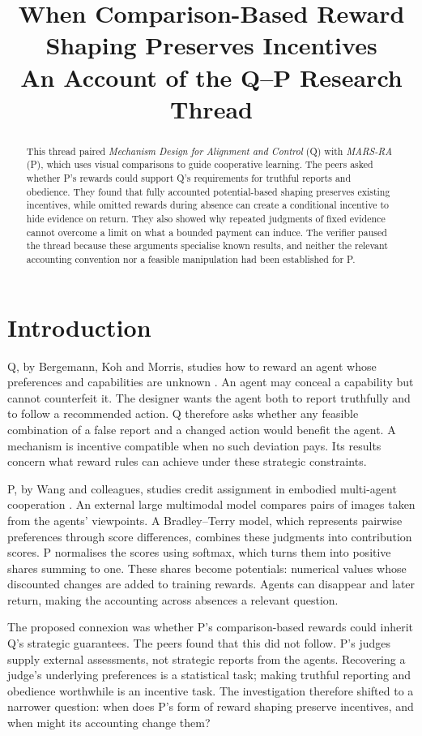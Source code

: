 \documentclass[11pt]{article}
\title{When Comparison-Based Reward Shaping Preserves Incentives\\
An Account of the Q--P Research Thread}
\author{}
\date{}
\begin{document}
\maketitle

\begin{abstract}
This thread paired \emph{Mechanism Design for Alignment and Control} (Q) with \emph{MARS-RA} (P), which uses
visual comparisons to guide cooperative learning.
The peers asked whether P's rewards could support Q's requirements for truthful reports and obedience.
They found that fully accounted potential-based shaping preserves existing incentives, while omitted rewards
during absence can create a conditional incentive to hide evidence on return.
They also showed why repeated judgments of fixed evidence cannot overcome a limit on what a bounded payment can induce.
The verifier paused the thread because these arguments specialise known results, and neither the relevant
accounting convention nor a feasible manipulation had been established for P.
\end{abstract}

\section{Introduction}

Q, by Bergemann, Koh and Morris, studies how to reward an agent whose preferences and capabilities are unknown
\cite{Q}. An agent may conceal a capability but cannot counterfeit it. The designer wants the agent both to
report truthfully and to follow a recommended action. Q therefore asks whether any feasible combination of a
false report and a changed action would benefit the agent. A mechanism is incentive compatible when no such
deviation pays. Its results concern what reward rules can achieve under these strategic constraints.

P, by Wang and colleagues, studies credit assignment in embodied multi-agent cooperation \cite{P}. An external
large multimodal model compares pairs of images taken from the agents' viewpoints. A Bradley--Terry model,
which represents pairwise preferences through score differences, combines these judgments into contribution
scores. P normalises the scores using softmax, which turns them into positive shares summing to one. These
shares become potentials: numerical values whose discounted changes are added to training rewards. Agents can
disappear and later return, making the accounting across absences a relevant question.

The proposed connexion was whether P's comparison-based rewards could inherit Q's strategic guarantees. The
peers found that this did not follow. P's judges supply external assessments, not strategic reports from the
agents. Recovering a judge's underlying preferences is a statistical task; making truthful reporting and
obedience worthwhile is an incentive task. The investigation therefore shifted to a narrower question: when
does P's form of reward shaping preserve incentives, and when might its accounting change them?
\end{document}
